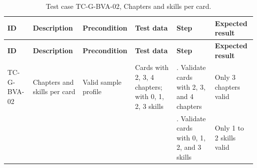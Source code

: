 {\footnotesize{}\renewcommand{\arraystretch}{1.1}
\begin{longtable}{|>{\raggedright\arraybackslash}p{}|>{\raggedright\arraybackslash}p{}|>{\raggedright\arraybackslash}p{}|>{\raggedright\arraybackslash}p{}|>{\raggedright\arraybackslash}p{}|>{\raggedright\arraybackslash}p{}|}
\caption{Test case TC-\allowbreak{}G-\allowbreak{}BVA-\allowbreak{}02, Chapters and skills per card.} \\
\hline
\textbf{ID} & \textbf{Description} & \textbf{Precondition} & \textbf{Test data} & \textbf{Step} & \textbf{Expected result} \\ \hline
\endfirsthead
\hline
\textbf{ID} & \textbf{Description} & \textbf{Precondition} & \textbf{Test data} & \textbf{Step} & \textbf{Expected result} \\ \hline
\endhead
TC-G-BVA-02 & Chapters and skills per card & Valid sample profile & Cards with 2, 3, 4 chapters; with 0, 1, 2, 3 skills & 1. Validate cards with 2, 3, and 4 chapters & Only 3 chapters valid \\ \cline{5-6}
 &  &  &  & 2. Validate cards with 0, 1, 2, and 3 skills & Only 1 to 2 skills valid \\ \hline
\end{longtable}
}


